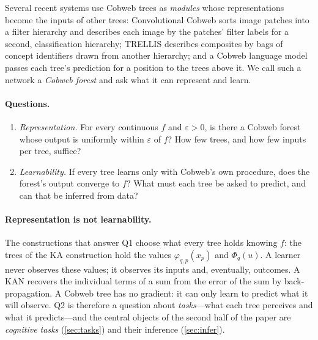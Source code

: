 \documentclass[11pt]{article}
\theoremstyle{definition}
\theoremstyle{remark}
\begin{document}
Several recent systems use Cobweb trees as \emph{modules} whose representations become
the inputs of other trees: Convolutional Cobweb \citep{maclellan2021conv} sorts image
patches into a filter hierarchy and describes each image by the patches' filter labels
for a second, classification hierarchy; TRELLIS \citep{singaravadivelan2026trellis}
describes composites by bags of concept identifiers drawn from another hierarchy; and a
Cobweb language model passes each tree's prediction for a position to the trees above
it.  We call such a network a \emph{Cobweb forest} and ask what it can represent and
learn.

\paragraph{Questions.}
\begin{enumerate}[label=\textbf{Q\arabic*.},leftmargin=*]
\item \emph{Representation.} For every continuous $f$ and $\varepsilon>0$, is there a
  Cobweb forest whose output is uniformly within $\varepsilon$ of $f$?  How few trees,
  and how few inputs per tree, suffice?
\item \emph{Learnability.} If every tree learns only with Cobweb's own procedure, does
  the forest's output converge to $f$?  What must each tree be asked to predict, and can
  that be inferred from data?
\end{enumerate}

\paragraph{Representation is not learnability.}
The constructions that answer Q1 choose what every tree holds knowing $f$: the trees of
the KA construction hold the values $\varphi_{q,p}(x_p)$ and $\Phi_q(u)$.  A learner never
observes these values; it observes its inputs and, eventually, outcomes.  A KAN recovers
the individual terms of a sum from the error of the sum by back-propagation.  A Cobweb
tree has no gradient: it can only learn to predict what it will observe.  Q2 is
therefore a question about \emph{tasks}---what each tree perceives and what it
predicts---and the central objects of the second half of the paper are \emph{cognitive
tasks} (\cref{sec:tasks}) and their inference (\cref{sec:infer}).
\end{document}
